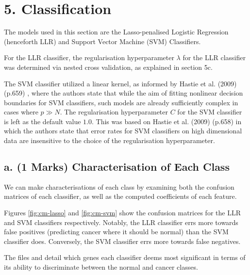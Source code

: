\documentclass[twocolumn]{article}
\begin{document}
\section{5. Classification}

The models used in this section are the Lasso-penalised Logistic Regression (henceforth LLR) and Support Vector Machine (SVM) Classifiers. 

For the LLR classifier, the regularisation hyperparameter $\lambda$ for the LLR classifier was determined via nested cross validation, as explained in section 5c.

The SVM classifier utilized a linear kernel, as informed by Hastie et al. (2009) (p.659) \cite{HastieTrevor2009EoSL}, where the authors state that while the aim of fitting nonlinear decision boundaries for SVM classifiers, such models are already sufficiently complex in cases where $p \gg N$. The regularisation hyperparameter $C$ for the SVM classifier is left as the default value $1.0$. This was based on Hastie et al. (2009) (p.658) \cite{HastieTrevor2009EoSL} in which the authors state that error rates for SVM classifiers on high dimensional data are insensitive to the choice of the regularisation hyperparameter. 

\subsection{a. (1 Marks) Characterisation of Each Class}

We can make characterisations of each class by examining both the confusion matrices of each classifier, as well as the computed coefficients of each feature. 

Figures \ref{fig:cm-lasso} and \ref{fig:cm-svm} show the confusion matrices for the LLR and SVM classifiers respectively. Notably, the LLR classifier errs more towards false positives (predicting cancer where it should be normal) than the SVM classifier does. Conversely, the SVM classifier errs more towards false negatives. 

The files  and  detail which genes each classifier deems most significant in terms of its ability to discriminate between the normal and cancer classes.
\end{document}
